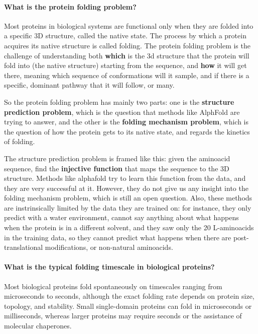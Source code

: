\newpage

\paragraph{What is the protein folding problem?}
Most proteins in biological systems are functional only when they are folded into a specific 3D structure, called the native state. The process by which a protein acquires its native structure is called folding. The protein folding problem is the challenge of understanding both \textbf{which} is the 3d structure that the protein will fold into (the native structure) starting from the sequence, and \textbf{how}
it will get there, meaning which sequence of conformations will it sample, and if there is a specific, dominant pathway that it will follow, or many.


So the protein folding problem has mainly two parts: one is the \textbf{structure prediction problem}, which is the question that methods like AlphFold are trying to answer,
and the other is the \textbf{folding mechanism problem}, which is the question of how the protein gets to its native state, and regards the kinetics of folding.

The structure prediction problem is framed like this: given the aminoacid sequence, find the \textbf{injective function} that maps the sequence to the 3D structure. 
Methods like alphafold try to learn this function from the data, and they are very successful at it. However, they do not give us any insight into the folding mechanism problem, which is still an open question.
Also, these methods are instrinsically limited by the data they are trained on: for instance, they only predict with a water environment, cannot say anything about what happens when the protein 
is in a different solvent, and they saw only the 20 L-aminoacids in the training data, so they cannot predict what happens when there are post-translational modifications, or non-natural aminoacids.


\paragraph{What is the typical folding timescale in biological proteins?}
Most biological proteins fold spontaneously on timescales ranging from microseconds to seconds, although the exact folding rate depends on protein size, topology, and stability. Small single-domain proteins can fold in microseconds or milliseconds, whereas larger proteins may require seconds or the assistance of molecular chaperones.


